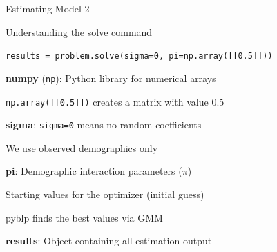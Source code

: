 \documentclass[notes,11pt, aspectratio=169]{beamer}
\newenvironment{wideitemize}{\itemize\addtolength{\itemsep}{10pt}}{\enditemize}
\begin{document}
\begin{frame}[fragile]{Estimating Model 2}
\end{frame}

\begin{frame}{Understanding the solve command}
	\begin{wideitemize}
		\item \colorbox{gray!20}{\texttt{results = problem.solve(sigma=0, pi=np.array([[0.5]]))}}
		\item \textbf{numpy} (\texttt{np}): Python library for numerical arrays
		\begin{wideitemize}
			\item \texttt{np.array([[0.5]])} creates a matrix with value 0.5
		\end{wideitemize}
		\item \textbf{sigma}: \texttt{sigma=0} means no random coefficients
		\begin{wideitemize}
			\item We use observed demographics only
		\end{wideitemize}
		\item \textbf{pi}: Demographic interaction parameters ($\pi$)
		\begin{wideitemize}
			\item Starting values for the optimizer (initial guess)
			\item pyblp finds the best values via GMM
		\end{wideitemize}
		\item \textbf{results}: Object containing all estimation output
	\end{wideitemize}
\end{frame}
\end{document}
